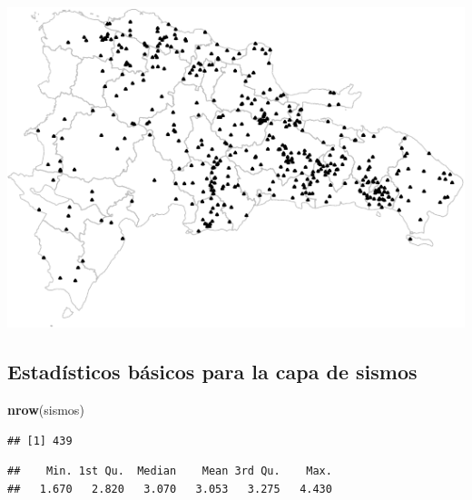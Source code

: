 \documentclass[11pt,]{article}
\newenvironment{Shaded}{\begin{snugshade}}{\end{snugshade}}
\newcommand{\KeywordTok}[1]{\textcolor[rgb]{0.13,0.29,0.53}{\textbf{#1}}}
\newcommand{\OperatorTok}[1]{\textcolor[rgb]{0.81,0.36,0.00}{\textbf{#1}}}
\newcommand{\NormalTok}[1]{#1}
\begin{document}
\includegraphics{proyecto_files/figure-latex/unnamed-chunk-6-1.pdf}

\subsection{Estadísticos básicos para la capa de
sismos}\label{estaduxedsticos-buxe1sicos-para-la-capa-de-sismos}

\begin{Shaded}
\begin{Highlighting}[]
\KeywordTok{nrow}\NormalTok{(sismos)}
\end{Highlighting}
\end{Shaded}

\begin{verbatim}
## [1] 439
\end{verbatim}

\begin{Shaded}
\end{Shaded}

\begin{verbatim}
##    Min. 1st Qu.  Median    Mean 3rd Qu.    Max. 
##   1.670   2.820   3.070   3.053   3.275   4.430
\end{verbatim}

\begin{Shaded}
\end{Shaded}
\end{document}
